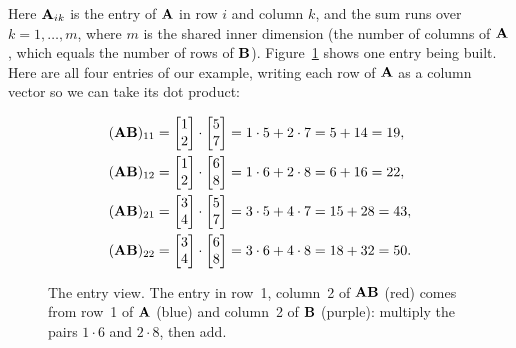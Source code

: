 Here $\mathbf{A}_{ik}$ is the entry of $\mathbf{A}$ in row $i$ and column $k$, and the sum
runs over $k = 1, \dots, m$, where $m$ is the shared inner dimension (the number of
columns of $\mathbf{A}$, which equals the number of rows of $\mathbf{B}$).
Figure~\ref{ch08:entryview} shows one entry being built. Here are all four entries
of our example, writing each row of $\mathbf{A}$ as a column vector so we can take its
dot product:

\begin{align*}
(\mathbf{A}\mathbf{B})_{11} &= \begin{bmatrix}1 \\ 2\end{bmatrix}\cdot\begin{bmatrix}5 \\ 7\end{bmatrix} = 1\cdot5 + 2\cdot7 = 5+14 = 19,\\
(\mathbf{A}\mathbf{B})_{12} &= \begin{bmatrix}1 \\ 2\end{bmatrix}\cdot\begin{bmatrix}6 \\ 8\end{bmatrix} = 1\cdot6 + 2\cdot8 = 6+16 = 22,\\
(\mathbf{A}\mathbf{B})_{21} &= \begin{bmatrix}3 \\ 4\end{bmatrix}\cdot\begin{bmatrix}5 \\ 7\end{bmatrix} = 3\cdot5 + 4\cdot7 = 15+28 = 43,\\
(\mathbf{A}\mathbf{B})_{22} &= \begin{bmatrix}3 \\ 4\end{bmatrix}\cdot\begin{bmatrix}6 \\ 8\end{bmatrix} = 3\cdot6 + 4\cdot8 = 18+32 = 50.
\end{align*}

\begin{figure}[htbp]
\centering
{}
\caption{The entry view. The entry in row~1, column~2 of $\mathbf{A}\mathbf{B}$ (red) comes
from row~1 of $\mathbf{A}$ (blue) and column~2 of $\mathbf{B}$ (purple): multiply the pairs
$1\cdot6$ and $2\cdot8$, then add.}
\label{ch08:entryview}
\end{figure}

